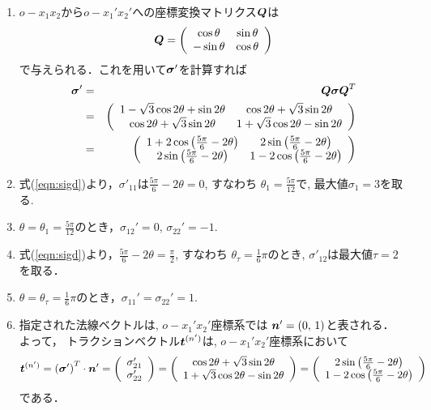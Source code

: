 \documentclass[10pt,a4j]{jarticle}
\begin{document}
\begin{enumerate}
\item
$o-x_1x_2$から$o-x_1'x_2'$への座標変換マトリクス$\mbox{\boldmath $Q$}$は
\[
	\mbox{\boldmath $Q$}=\left(
		\begin{array}{cc}
			\cos \theta & \sin \theta \\
			-\sin\theta & \cos \theta
		\end{array}
	\right)
\]
で与えられる．これを用いて$\mbox{\boldmath $\sigma$}'$を計算すれば
\begin{eqnarray}
	\mbox{\boldmath $\sigma$} ' 
	&=& 
	\mbox{\boldmath $Q \sigma Q$}^T\\
	&=&
 	\left( 
 	\begin{array}{cc}
		1- \sqrt{3} \cos 2\theta+ \sin 2 \theta & 
		\cos 2\theta +\sqrt{3}\sin 2\theta  \\
		\cos 2\theta +\sqrt{3}\sin 2\theta   &
		1+ \sqrt{3} \cos 2\theta - \sin 2 \theta 
	\end{array}
	\right) \\
 &=&
 \left(
 	\begin{array}{cc}
		1+ 2 \cos \left( \frac{5\pi}{6} -2\theta\right) & 
		2\sin \left(\frac{5\pi}{6} -2 \theta\right) \\
		2\sin \left(\frac{5\pi}{6} -2 \theta\right) & 
		1- 2 \cos \left( \frac{5\pi}{6} -2\theta\right) 
 	\end{array}
 \right)
	\label{eqn:sigd}
\end{eqnarray}
\item
	式(\ref{eqn:sigd})より，$\sigma'_{11}$は$\frac{5\pi}{6} -2\theta=0$, すなわち
	$\theta_1=\frac{5\pi}{12}$で, 最大値$\sigma_1=3$を取る.
\item
	$\theta=\theta_1=\frac{5\pi}{12}$のとき，$\sigma_{12}'=0,\, \sigma_{22}'=-1$.
\item
	式(\ref{eqn:sigd})より，$\frac{5\pi}{6}-2\theta=\frac{\pi}{2}$, すなわち
	$\theta_\tau=\frac{1}{6}\pi$のとき, $\sigma'_{12}$は最大値$\tau=2$を取る．
\item
	$\theta=\theta_{\tau}=\frac{1}{6}\pi$のとき，$\sigma_{11}'=\sigma_{22}'=1$.
\item
	指定された法線ベクトルは, $o-x_1'x_2'$座標系では
	$\mbox{\boldmath $n$}'=(0,\, 1)$と表される． よって，
	トラクションベクトル$\mbox{\boldmath $t$}^{(n')}$は, $o-x_1'x_2'$座標系において
	\begin{equation}
		\mbox{\boldmath $t$}^{(n')}= \left( \mbox{\boldmath $\sigma$}'\right)^T \cdot \mbox{\boldmath $n$}'
		= 
		\left( 
			\begin{array}{c} 
				\sigma_{21}' \\ 
				\sigma_{22}'
			\end{array}
		\right)
		=
		\left(
			\begin{array}{c}
				\cos 2\theta +\sqrt{3} \sin 2\theta \\
				1+ \sqrt{3} \cos 2\theta-\sin 2 \theta 
			\end{array}
		\right)
		=
		\left(
			\begin{array}{c}
			2\sin \left(\frac{5\pi}{6} -2 \theta\right)\\
			1-2 \cos \left( \frac{5\pi}{6} -2\theta\right)
 		\end{array}
		\right) 
	\end{equation}
	である．
\end{enumerate}
\end{document}
